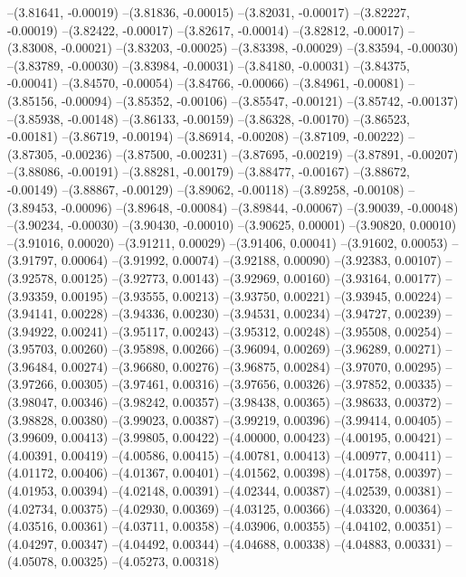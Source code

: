 --(3.81641, -0.00019)
--(3.81836, -0.00015)
--(3.82031, -0.00017)
--(3.82227, -0.00019)
--(3.82422, -0.00017)
--(3.82617, -0.00014)
--(3.82812, -0.00017)
--(3.83008, -0.00021)
--(3.83203, -0.00025)
--(3.83398, -0.00029)
--(3.83594, -0.00030)
--(3.83789, -0.00030)
--(3.83984, -0.00031)
--(3.84180, -0.00031)
--(3.84375, -0.00041)
--(3.84570, -0.00054)
--(3.84766, -0.00066)
--(3.84961, -0.00081)
--(3.85156, -0.00094)
--(3.85352, -0.00106)
--(3.85547, -0.00121)
--(3.85742, -0.00137)
--(3.85938, -0.00148)
--(3.86133, -0.00159)
--(3.86328, -0.00170)
--(3.86523, -0.00181)
--(3.86719, -0.00194)
--(3.86914, -0.00208)
--(3.87109, -0.00222)
--(3.87305, -0.00236)
--(3.87500, -0.00231)
--(3.87695, -0.00219)
--(3.87891, -0.00207)
--(3.88086, -0.00191)
--(3.88281, -0.00179)
--(3.88477, -0.00167)
--(3.88672, -0.00149)
--(3.88867, -0.00129)
--(3.89062, -0.00118)
--(3.89258, -0.00108)
--(3.89453, -0.00096)
--(3.89648, -0.00084)
--(3.89844, -0.00067)
--(3.90039, -0.00048)
--(3.90234, -0.00030)
--(3.90430, -0.00010)
--(3.90625, 0.00001)
--(3.90820, 0.00010)
--(3.91016, 0.00020)
--(3.91211, 0.00029)
--(3.91406, 0.00041)
--(3.91602, 0.00053)
--(3.91797, 0.00064)
--(3.91992, 0.00074)
--(3.92188, 0.00090)
--(3.92383, 0.00107)
--(3.92578, 0.00125)
--(3.92773, 0.00143)
--(3.92969, 0.00160)
--(3.93164, 0.00177)
--(3.93359, 0.00195)
--(3.93555, 0.00213)
--(3.93750, 0.00221)
--(3.93945, 0.00224)
--(3.94141, 0.00228)
--(3.94336, 0.00230)
--(3.94531, 0.00234)
--(3.94727, 0.00239)
--(3.94922, 0.00241)
--(3.95117, 0.00243)
--(3.95312, 0.00248)
--(3.95508, 0.00254)
--(3.95703, 0.00260)
--(3.95898, 0.00266)
--(3.96094, 0.00269)
--(3.96289, 0.00271)
--(3.96484, 0.00274)
--(3.96680, 0.00276)
--(3.96875, 0.00284)
--(3.97070, 0.00295)
--(3.97266, 0.00305)
--(3.97461, 0.00316)
--(3.97656, 0.00326)
--(3.97852, 0.00335)
--(3.98047, 0.00346)
--(3.98242, 0.00357)
--(3.98438, 0.00365)
--(3.98633, 0.00372)
--(3.98828, 0.00380)
--(3.99023, 0.00387)
--(3.99219, 0.00396)
--(3.99414, 0.00405)
--(3.99609, 0.00413)
--(3.99805, 0.00422)
--(4.00000, 0.00423)
--(4.00195, 0.00421)
--(4.00391, 0.00419)
--(4.00586, 0.00415)
--(4.00781, 0.00413)
--(4.00977, 0.00411)
--(4.01172, 0.00406)
--(4.01367, 0.00401)
--(4.01562, 0.00398)
--(4.01758, 0.00397)
--(4.01953, 0.00394)
--(4.02148, 0.00391)
--(4.02344, 0.00387)
--(4.02539, 0.00381)
--(4.02734, 0.00375)
--(4.02930, 0.00369)
--(4.03125, 0.00366)
--(4.03320, 0.00364)
--(4.03516, 0.00361)
--(4.03711, 0.00358)
--(4.03906, 0.00355)
--(4.04102, 0.00351)
--(4.04297, 0.00347)
--(4.04492, 0.00344)
--(4.04688, 0.00338)
--(4.04883, 0.00331)
--(4.05078, 0.00325)
--(4.05273, 0.00318)
